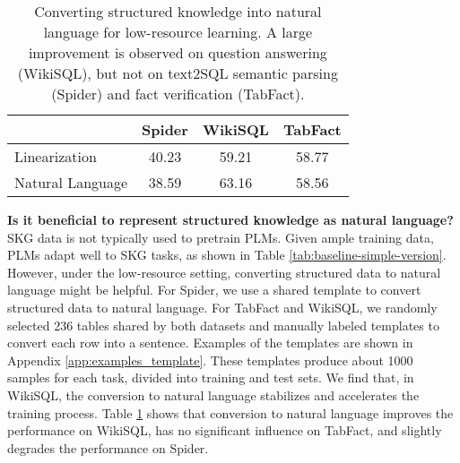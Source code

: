 \begin{table}[t]
	\centering
	\small
	\begin{adjustbox}{width=0.85\linewidth}
		\begin{tabular}{@{}lccc@{}}
		    \toprule
			& Spider & WikiSQL & TabFact \\
			\midrule
			Linearization  & 40.23 & 59.21 & 58.77  \\
			Natural Language & 38.59 & 63.16 & 58.56  \\
			\bottomrule
		\end{tabular}
	\end{adjustbox}
	\caption{Converting structured knowledge into natural language for low-resource learning. 
	A large improvement is observed on question answering (WikiSQL), but not on text2SQL semantic parsing (Spider) and fact verification (TabFact). }
	\label{tab:convert-to-nl}
\end{table}\noindent\textbf{Is it beneficial to represent structured knowledge as natural language?}
SKG data is not typically used to pretrain PLMs. Given ample training data, PLMs adapt well to SKG tasks, as shown in Table \ref{tab:baseline-simple-version}. However, under the low-resource setting, converting structured data to natural language might be helpful. 
For Spider, we use a shared template to convert structured data to natural language. 
For TabFact and WikiSQL, we randomly selected 236 tables shared by both datasets and manually labeled templates to convert each row into a sentence. Examples of the templates are shown in Appendix \ref{app:examples_template}. These templates produce about 1000 samples for each task, divided into training and test sets. We find that, in WikiSQL, the conversion to natural language stabilizes and accelerates the training process. %
Table \ref{tab:convert-to-nl} shows that conversion to natural language improves the performance on WikiSQL, has no significant influence on TabFact, and slightly degrades the performance on Spider.

